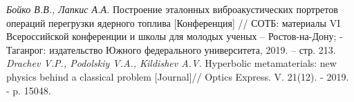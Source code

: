 \documentclass[oneside, a5paper,10pt]{article}
\begin{document}
{\begin{thebibliography}{9}
	\textit{Бойко В.В., Лапкис А.А.} Построение эталонных виброакустических портретов операций перегрузки
	ядерного топлива [Конференция] // СОТБ: материалы VI Всероссийской конференции и школы для молодых ученых
	– Ростов-на-Дону; - Таганрог: издательство Южного федерального университета, 2019. – стр. 213. 
	\textit{Drachev V.P., Podolskiy V.A., Kildishev A.V.} Hyperbolic metamaterials: new physics behind
	a classical problem [Journal]// Optics Express. V. 21(12). - 2019. - p. 15048.
\end{thebibliography}
}
\end{document}
